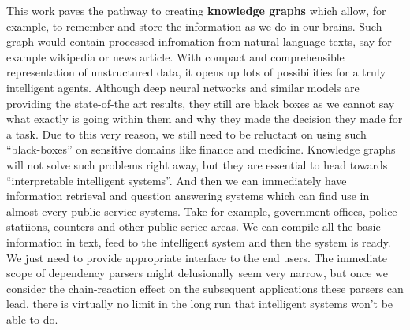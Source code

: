 \newline
\newline
This work paves the pathway to creating \textbf{knowledge graphs} which allow, for
example, to remember and store the information as we do in our brains. Such
graph would contain processed infromation from natural language texts, say for
example wikipedia or news article. With compact and comprehensible
representation of unstructured data, it opens up lots of possibilities for a
truly intelligent agents. Although deep neural networks and similar models are
providing the state-of-the art results, they still are black boxes as we cannot
say what exactly is going within them and why they made the decision they made
for a task. Due to this very reason, we still need to be reluctant on using
such ``black-boxes'' on sensitive domains like finance and medicine. Knowledge
graphs will not solve such problems right away, but they are essential to head
towards ``interpretable intelligent systems''.
\newline
\newline
And then we can immediately have information retrieval and question answering
systems which can find use in almost every public service systems. Take for
example, government offices, police statiions, counters and other public serice
areas. We can compile all the basic information in text, feed to the
intelligent system and then the system is ready. We just need to provide
appropriate interface to the end users.
\newline
\newline
The immediate scope of dependency parsers might delusionally seem very narrow,
but once we consider the chain-reaction effect on the subsequent applications
these parsers can lead, there is virtually no limit in the long run that
intelligent systems won't be able to do.


